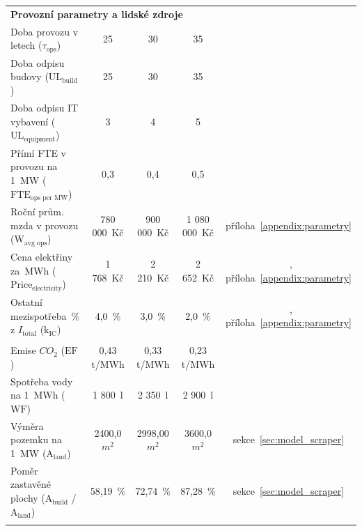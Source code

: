 \begin{landscape}
\begin{longtable}{lcccc}
        \multicolumn{5}{l}{\textbf{Provozní parametry a lidské zdroje}} \\
        Doba provozu v letech ($\tau_{\text{ops}}$) & 25 & 30 & 35 &~\cite{barroso_data_2026} \\
        Doba odpisu budovy ($\text{UL}_\text{build}$) & 25 & 30 & 35 &~\cite{barroso_data_2026} \\
        Doba odpisu IT vybavení ($\text{UL}_\text{equipment}$) & 3 & 4 & 5 &~\cite{barroso_data_2026} \\
        Přímí FTE v provozu na 1~MW ($\text{FTE}_\text{ops per~MW}$) & 0,3 & 0,4 & 0,5 &~\cite{to_albertas_2025, lee_breaking_2025,  diao_economic_2025}  \\
        Roční prům. mzda v provozu ($\text{W}_\text{avg ops}$) & 780 000~Kč & 900 000~Kč & 1 080 000~Kč & příloha~\ref{appendix:parametry} \\
        Cena elektřiny za~MWh ($\text{Price}_\text{electricity}$) & 1 768~Kč & 2 210~Kč & 2 652~Kč &~\cite{ember_average_2026}, příloha~\ref{appendix:parametry} \\
        Ostatní mezispotřeba~\% z $I_\text{total}$ ($\text{k}_\text{IC}$) & 4,0~\% & 3,0~\% & 2,0~\% &~\cite{pham_data_2017}, příloha~\ref{appendix:parametry} \\
        
        \addlinespace
        \midrule
        \addlinespace

        \multicolumn{5}{l}{\textbf{Environmentální faktory a pozemky}} \\
        Emise $CO_2$ ($\text{EF}$) & 0,43 t/MWh & 0,33 t/MWh & 0,23 t/MWh &~\cite{bufka_hodnota_2026} \\
        Spotřeba vody na 1~MWh ($\text{WF}$) & 1 800~l & 2 350~l & 2 900~l &~\cite{pilz_compute_2023, de_roucy-rochegonde_ai_2025, sheng_power_2026, international_energy_agency_iea_energy_2025} \\
        Výměra pozemku na 1~MW ($\text{A}_\text{land}$) & 2400,0 $m^2$ & 2998,00 $m^2$ & 3600,0 $m^2$ & sekce~\ref{sec:model_scraper} \\
        Poměr zastavěné plochy ($\text{A}_\text{build}$ / $\text{A}_\text{land}$) & 58,19~\% & 72,74~\% & 87,28~\% & sekce~\ref{sec:model_scraper} \\

        \addlinespace
        \midrule
        \addlinespace


\end{longtable}
\end{landscape}
